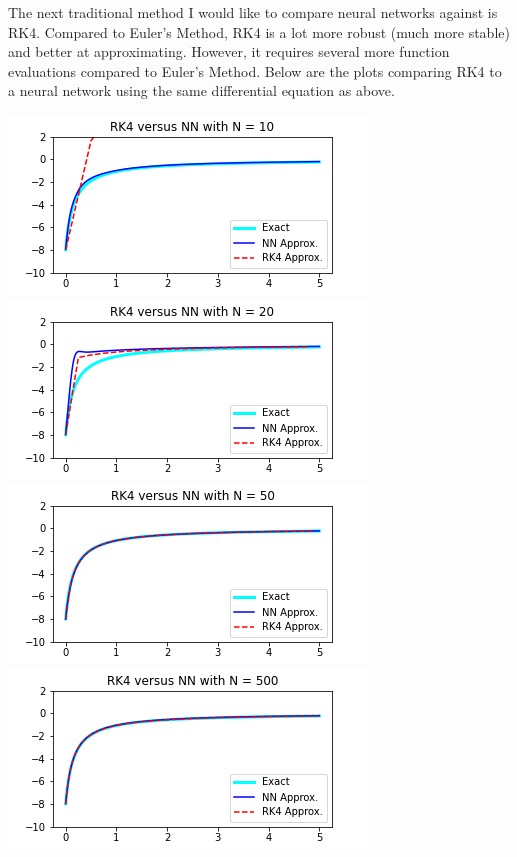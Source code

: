 \documentclass[12pt]{article}
\begin{document}
\begin{description}
    The next traditional method I would like to compare neural networks against
    is RK4. Compared to Euler's Method, RK4 is a lot more robust (much more
    stable) and better at approximating. However, it requires several more
    function evaluations compared to Euler's Method. Below are the plots
    comparing RK4 to a neural network using the same differential equation as
    above. \\
    \begin{minipage}{\linewidth}
        \centering
        \includegraphics[scale=.5]{images/rk10.png}
        \includegraphics[scale=.5]{images/rk20.png}
        \includegraphics[scale=.5]{images/rk50.png}
        \includegraphics[scale=.5]{images/rk500.png}

\end{minipage}
\end{description}
\end{document}
